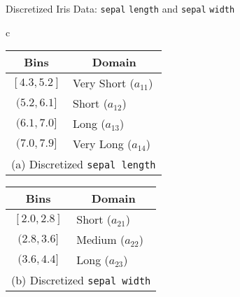 \begin{frame}{Discretized Iris Data: \texttt{sepal} {\tt length} and
  \texttt{sepal} {\tt width}}

  {\begin{tabular}{c}
{
{
    \label{tab:class:prob:slbin}
\renewcommand{\arraystretch}{1.1} 
\begin{tabular}{|c|l|}
\hline
Bins & \multicolumn{1}{c|}{Domain} \\ \hline
$[4.3, 5.2]$ & Very Short ($a_{11}$) \\
$(5.2, 6.1]$ & Short ($a_{12}$) \\
$(6.1, 7.0]$ & Long ($a_{13}$)\\
$(7.0, 7.9]$ & Very Long ($a_{14}$)\\ \hline
\multicolumn{2}{c}{\fontsize{8}{8}\selectfont(a) Discretized {\tt sepal length}}\\
\end{tabular}
}
{
\label{tab:class:prob:swbin}
\renewcommand{\arraystretch}{1.1}  
\begin{tabular}{|c|l|}
  \hline
  Bins & \multicolumn{1}{c|}{Domain} \\ \hline
  $[2.0, 2.8]$ & Short ($a_{21}$) \\
  $(2.8, 3.6]$ & Medium ($a_{22}$)\\
  $(3.6, 4.4]$ & Long ($a_{23}$)\\ \hline
  \multicolumn{2}{c}{\fontsize{8}{8}\selectfont(b) Discretized {\tt sepal width}}\\
\end{tabular}
    }}
\end{tabular}}
\end{frame}



